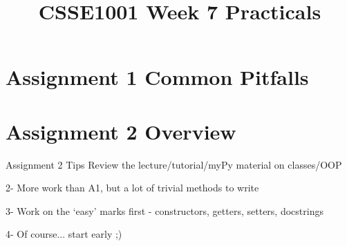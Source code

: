 \documentclass[week2]{csse1001}
\title{CSSE1001 Week 7 Practicals}
\begin{document}
\begin{frame} 
\maketitle
\end{frame}

\section{Assignment 1 Common Pitfalls}



\section{Assignment 2 Overview}

\begin{topic}{Assignment 2 Tips}
Review the lecture/tutorial/myPy material on classes/OOP

\begin{subtopic}{2-}
More work than A1, but a lot of trivial methods to write
\end{subtopic}

\begin{subtopic}{3-}
Work on the `easy' marks first - constructors, getters, setters, docstrings
\end{subtopic}

\begin{subtopic}{4-}
Of course... start early ;)
\end{subtopic}
\end{topic}
\end{document}
